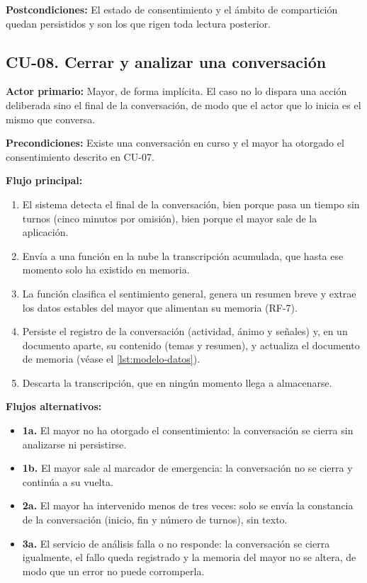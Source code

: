 \noindent\textbf{Postcondiciones:} El estado de consentimiento y el ámbito de compartición quedan
persistidos y son los que rigen toda lectura posterior.

\bigskip

\subsection*{CU-08. Cerrar y analizar una conversación}

\noindent\textbf{Actor primario:} Mayor, de forma implícita. El caso no lo dispara una acción deliberada
sino el final de la conversación, de modo que el actor que lo inicia es el mismo que conversa.

\noindent\textbf{Precondiciones:} Existe una conversación en curso y el mayor ha otorgado el consentimiento
descrito en CU-07.

\noindent\textbf{Flujo principal:}
\begin{enumerate}[nosep]
    \item El sistema detecta el final de la conversación, bien porque pasa un tiempo sin turnos (cinco
    minutos por omisión), bien porque el mayor sale de la aplicación.
    \item Envía a una función en la nube la transcripción acumulada, que hasta ese momento solo ha existido
    en memoria.
    \item La función clasifica el sentimiento general, genera un resumen breve y extrae los datos estables
    del mayor que alimentan su memoria (RF-7).
    \item Persiste el registro de la conversación (actividad, ánimo y señales) y, en un documento aparte, su contenido (temas y resumen), y actualiza el documento de memoria (véase el \autoref{lst:modelo-datos}).
    \item Descarta la transcripción, que en ningún momento llega a almacenarse.
\end{enumerate}

\noindent\textbf{Flujos alternativos:}
\begin{itemize}[nosep]
    \item \textbf{1a.} El mayor no ha otorgado el consentimiento: la conversación se cierra sin analizarse
    ni persistirse.
    \item \textbf{1b.} El mayor sale al marcador de emergencia: la conversación no se cierra y continúa a
    su vuelta.
    \item \textbf{2a.} El mayor ha intervenido menos de tres veces: solo se envía la constancia de la
    conversación (inicio, fin y número de turnos), sin texto.
    \item \textbf{3a.} El servicio de análisis falla o no responde: la conversación se cierra igualmente,
    el fallo queda registrado y la memoria del mayor no se altera, de modo que un error no puede
    corromperla.
\end{itemize}

